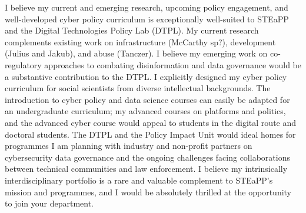 \documentclass[11pt]{letter}
\begin{document}
\begin{letter}
I believe my current and emerging research, upcoming policy engagement, and well-developed cyber policy curriculum is exceptionally well-suited to STEaPP and the Digital Technologies Policy Lab (DTPL).
%
My current research complements existing work on infrastructure (McCarthy sp?), development (Julius and Jakub), and abuse (Tanczer).
%
I believe my emerging work on co-regulatory approaches to combating disinformation and data governance would be a substantive contribution to the DTPL.
%
I explicitly designed my cyber policy curriculum for social scientists from diverse intellectual backgrounds.
%
The introduction to cyber policy and data science courses can easily be adapted for an undergraduate curriculum; my advanced courses on platforms and politics, and the advanced cyber course would appeal to students in the digital route and doctoral students.
%
The DTPL and the Policy Impact Unit would ideal homes for programmes I am planning with industry and non-profit partners on cybersecurity data governance and the ongoing challenges facing collaborations between technical communities and law enforcement.
%
I believe my intrinsically interdisciplinary portfolio is a rare and valuable complement to STEaPP's mission and programmes, and I would be absolutely thrilled at the opportunity to join your department.





%
%


%





\end{letter}
\end{document}
